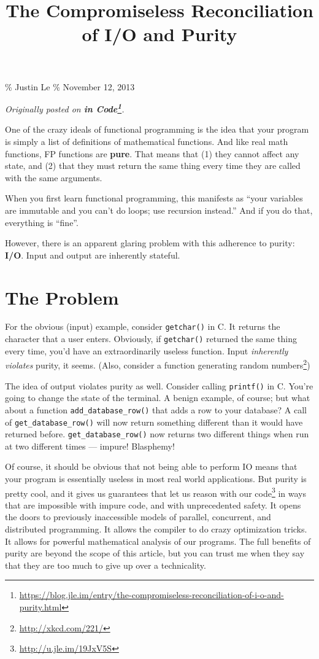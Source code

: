 \documentclass[]{article}
\title{The Compromiseless Reconciliation of I/O and Purity}
\renewcommand{\href}[2]{#2\footnote{\url{#1}}}
\begin{document}
\maketitle

\% Justin Le \% November 12, 2013

\emph{Originally posted on
\textbf{\href{https://blog.jle.im/entry/the-compromiseless-reconciliation-of-i-o-and-purity.html}{in
Code}}.}

One of the crazy ideals of functional programming is the idea that your program
is simply a list of definitions of mathematical functions. And like real math
functions, FP functions are \textbf{pure}. That means that (1) they cannot
affect any state, and (2) that they must return the same thing every time they
are called with the same arguments.

When you first learn functional programming, this manifests as ``your variables
are immutable and you can't do loops; use recursion instead.'' And if you do
that, everything is ``fine''.

However, there is an apparent glaring problem with this adherence to purity:
\textbf{I/O}. Input and output are inherently stateful.

\section{The Problem}\label{the-problem}

For the obvious (input) example, consider \texttt{getchar()} in C. It returns
the character that a user enters. Obviously, if \texttt{getchar()} returned the
same thing every time, you'd have an extraordinarily useless function. Input
\emph{inherently violates} purity, it seems. (Also, consider a
\href{http://xkcd.com/221/}{function generating random numbers})

The idea of output violates purity as well. Consider calling \texttt{printf()}
in C. You're going to change the state of the terminal. A benign example, of
course; but what about a function \texttt{add\_database\_row()} that adds a row
to your database? A call of \texttt{get\_database\_row()} will now return
something different than it would have returned before.
\texttt{get\_database\_row()} now returns two different things when run at two
different times --- impure! Blasphemy!

Of course, it should be obvious that not being able to perform IO means that
your program is essentially useless in most real world applications. But purity
is pretty cool, and it gives us guarantees that let us
\href{http://u.jle.im/19JxV5S}{reason with our code} in ways that are impossible
with impure code, and with unprecedented safety. It opens the doors to
previously inaccessible models of parallel, concurrent, and distributed
programming. It allows the compiler to do crazy optimization tricks. It allows
for powerful mathematical analysis of our programs. The full benefits of purity
are beyond the scope of this article, but you can trust me when they say that
they are too much to give up over a technicality.
\end{document}
